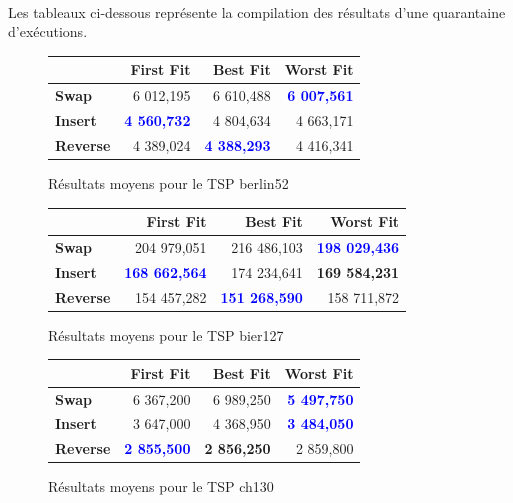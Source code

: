\documentclass[a4paper,10pt]{report}
\begin{document}
\paragraph{}
  Les tableaux ci-dessous représente la compilation des résultats d'une
quarantaine d'exécutions.

\begin{figure}[h]
  \begin{center}
    \begin{tabular}{|l|r|r|r|}
      \hline
      &		\textbf{First Fit}&	\textbf{Best Fit}&	\textbf{Worst
Fit}\\\hline
      \textbf{Swap}&
	  6 012,195&
	  6 610,488&
	  \textbf{\textcolor{blue}{6 007,561}}\\\hline
      \textbf{Insert}&
	  \textbf{\textcolor{blue}{4 560,732}}&
	  4 804,634&
	  4 663,171\\\hline
      \textbf{Reverse}&
	  4 389,024&
	  \textbf{\textcolor{blue}{4 388,293}}&
	  4 416,341\\\hline
    \end{tabular}
    \caption{Résultats moyens pour le TSP berlin52}
  \end{center}
\end{figure}

\begin{figure}[h]
  \begin{center}
    \begin{tabular}{|l|r|r|r|}
      \hline
      &		\textbf{First Fit}&	\textbf{Best Fit}&	\textbf{Worst
Fit}\\\hline
      \textbf{Swap}&
	  204 979,051&
	  216 486,103&
	  \textbf{\textcolor{blue}{198 029,436}}\\\hline
      \textbf{Insert}&
	  \textbf{\textcolor{blue}{168 662,564}}&
	  174 234,641&
	  \textbf{169 584,231}\\\hline
      \textbf{Reverse}&
	  154 457,282&
	  \textbf{\textcolor{blue}{151 268,590}}&
	  158 711,872\\\hline
    \end{tabular}
    \caption{Résultats moyens pour le TSP bier127}
  \end{center}
\end{figure}

\begin{figure}[h]
  \begin{center}
    \begin{tabular}{|l|r|r|r|}
      \hline
      &		\textbf{First Fit}&	\textbf{Best Fit}&	\textbf{Worst
Fit}\\\hline
      \textbf{Swap}&
	  6 367,200&
	  6 989,250&
	  \textbf{\textcolor{blue}{5 497,750}}\\\hline
      \textbf{Insert}&
	  3 647,000&
	  4 368,950&
	  \textbf{\textcolor{blue}{3 484,050}}\\\hline
      \textbf{Reverse}&
	  \textbf{\textcolor{blue}{2 855,500}}&
	  \textbf{2 856,250}&
	  2 859,800\\\hline
    \end{tabular}
    \caption{Résultats moyens pour le TSP ch130}
  \end{center}
\end{figure}
\end{document}
